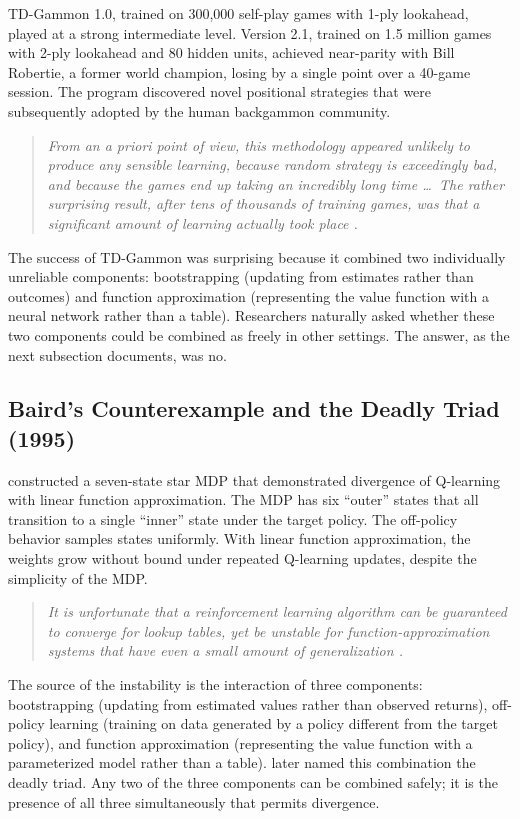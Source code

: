 TD-Gammon 1.0, trained on 300{,}000 self-play games with 1-ply lookahead, played at a strong intermediate level. Version 2.1, trained on 1.5 million games with 2-ply lookahead and 80 hidden units, achieved near-parity with Bill Robertie, a former world champion, losing by a single point over a 40-game session. The program discovered novel positional strategies that were subsequently adopted by the human backgammon community.

\begin{quote}\itshape
From an a priori point of view, this methodology appeared unlikely to produce any sensible learning, because random strategy is exceedingly bad, and because the games end up taking an incredibly long time \ldots\ The rather surprising result, after tens of thousands of training games, was that a significant amount of learning actually took place \citep{tesauro1994}.
\end{quote}

The success of TD-Gammon was surprising because it combined two individually unreliable components: bootstrapping (updating from estimates rather than outcomes) and function approximation (representing the value function with a neural network rather than a table). Researchers naturally asked whether these two components could be combined as freely in other settings. The answer, as the next subsection documents, was no.

\subsection{Baird's Counterexample and the Deadly Triad (1995)}

\citet{Baird1995} constructed a seven-state star MDP that demonstrated divergence of Q-learning with linear function approximation. The MDP has six ``outer'' states that all transition to a single ``inner'' state under the target policy. The off-policy behavior samples states uniformly. With linear function approximation, the weights grow without bound under repeated Q-learning updates, despite the simplicity of the MDP.

\begin{quote}\itshape
It is unfortunate that a reinforcement learning algorithm can be guaranteed to converge for lookup tables, yet be unstable for function-approximation systems that have even a small amount of generalization \citep{Baird1995}.
\end{quote}

The source of the instability is the interaction of three components: bootstrapping (updating from estimated values rather than observed returns), off-policy learning (training on data generated by a policy different from the target policy), and function approximation (representing the value function with a parameterized model rather than a table). \citet{sutton2018} later named this combination the deadly triad. Any two of the three components can be combined safely; it is the presence of all three simultaneously that permits divergence.

